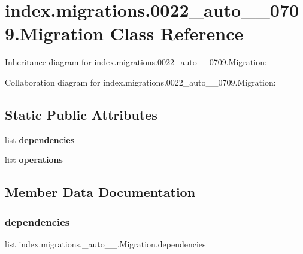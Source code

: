 \hypertarget{classindex_1_1migrations_1_10022__auto__20171026__0709_1_1Migration}{}\section{index.\+migrations.0022\+\_\+auto\+\_\+\_\+0709.Migration Class Reference}
\label{classindex_1_1migrations_1_10022__auto__20171026__0709_1_1Migration}


Inheritance diagram for index.\+migrations.0022\+\_\+auto\+\_\+\_\+0709.Migration\+:


Collaboration diagram for index.\+migrations.0022\+\_\+auto\+\_\+\_\+0709.Migration\+:
\subsection*{Static Public Attributes}
\begin{DoxyCompactItemize}
\item 
list {\bfseries dependencies}
\item 
list {\bfseries operations}
\end{DoxyCompactItemize}


\subsection{Member Data Documentation}
\mbox{\label{classindex_1_1migrations_1_10022__auto__20171026__0709_1_1Migration_a0ebd4672788029fd58b39dd157fbecfc}} 
\subsubsection{\texorpdfstring{dependencies}{dependencies}}
{\footnotesize\ttfamily list index.\+migrations.\+\_\+auto\+\_\+\_.\+Migration.\+dependencies\hspace{0.3cm}{\ttfamily [static]}}

